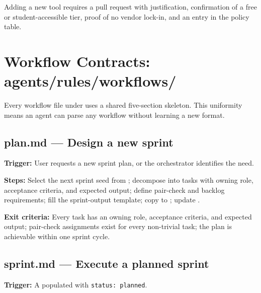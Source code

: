 \documentclass[a4paper,11pt,openany]{report}
\begin{document}
Adding a new tool requires a pull request with justification, confirmation of a
free or student-accessible tier, proof of no vendor lock-in, and an entry in the
policy table.



\chapter{Workflow Contracts: agents/rules/workflows/}
\label{ch:workflows}


Every workflow file under  uses a shared five-section
skeleton. This uniformity means an agent can parse any workflow without
learning a new format.

\section{plan.md --- Design a new sprint}

\textbf{Trigger:} User requests a new sprint plan, or the orchestrator
identifies the need.

\textbf{Steps:} Select the next sprint seed from
; decompose into tasks with owning role, acceptance
criteria, and expected output; define pair-check and backlog requirements; fill
the sprint-output template; copy to ; update
.

\textbf{Exit criteria:} Every task has an owning role, acceptance criteria, and
expected output; pair-check assignments exist for every non-trivial task; the
plan is achievable within one sprint cycle.

\section{sprint.md --- Execute a planned sprint}

\textbf{Trigger:} A populated  with
\texttt{status: planned}.
\end{document}
